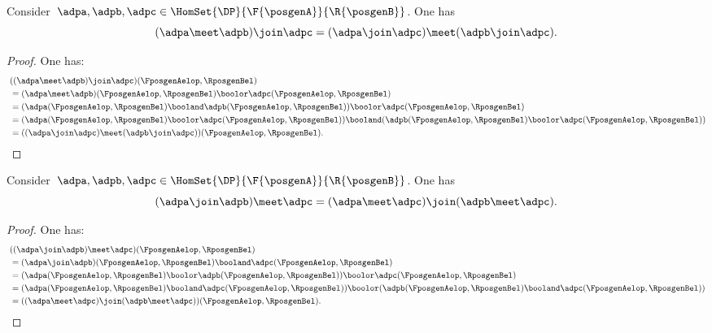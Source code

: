 \begin{lemma}
    \label{lem:vee_wedge}
    Consider~$\adpa,\adpb,\adpc\in \HomSet{\DP}{\F{\posgenA}}{\R{\posgenB}}$.
    One has
    \begin{equation*}
        (\adpa \meet \adpb)
        \join \adpc=(\adpa \join \adpc) \meet (\adpb\join \adpc).
    \end{equation*}
\end{lemma}
\begin{proof}
    One has:
    \begin{equation*}
        \begin{aligned}
            ~ & ((\adpa \meet \adpb)\join \adpc)(\FposgenAelop,\RposgenBel) \\
              & =
            (\adpa \meet \adpb)(\FposgenAelop,\RposgenBel)\boolor \adpc(\FposgenAelop,\RposgenBel) \\
              & =(\adpa(\FposgenAelop,\RposgenBel) \booland \adpb(\FposgenAelop,\RposgenBel))\boolor \adpc(\FposgenAelop,\RposgenBel) \\
              & =(\adpa(\FposgenAelop,\RposgenBel) \boolor  \adpc(\FposgenAelop,\RposgenBel)) \booland (\adpb(\FposgenAelop,\RposgenBel)\boolor \adpc(\FposgenAelop,\RposgenBel)) \\
              & =((\adpa \join \adpc) \meet (\adpb\join \adpc))(\FposgenAelop,\RposgenBel).
        \end{aligned}
    \end{equation*}
\end{proof}

\begin{lemma}
    \label{lem:wedge_vee}
    Consider~$\adpa,\adpb,\adpc\in \HomSet{\DP}{\F{\posgenA}}{\R{\posgenB}}$.
    One has
    \begin{equation*}
        (\adpa \join \adpb)
        \meet \adpc=(\adpa \meet \adpc) \join (\adpb\meet \adpc).
    \end{equation*}
\end{lemma}
\begin{proof}
    One has:
    \begin{equation*}
        \begin{aligned}
            ~ & ((\adpa \join \adpb)\meet \adpc)(\FposgenAelop,\RposgenBel) \\
              & = (\adpa \join \adpb)(\FposgenAelop,\RposgenBel)\booland \adpc(\FposgenAelop,\RposgenBel) \\
              & =(\adpa(\FposgenAelop,\RposgenBel) \boolor \adpb(\FposgenAelop,\RposgenBel))\boolor \adpc(\FposgenAelop,\RposgenBel) \\
              & =(\adpa(\FposgenAelop,\RposgenBel) \booland  \adpc(\FposgenAelop,\RposgenBel)) \boolor (\adpb(\FposgenAelop,\RposgenBel)\booland \adpc(\FposgenAelop,\RposgenBel)) \\
              & =((\adpa \meet \adpc) \join (\adpb\meet \adpc))(\FposgenAelop,\RposgenBel).
        \end{aligned}
    \end{equation*}
\end{proof}

